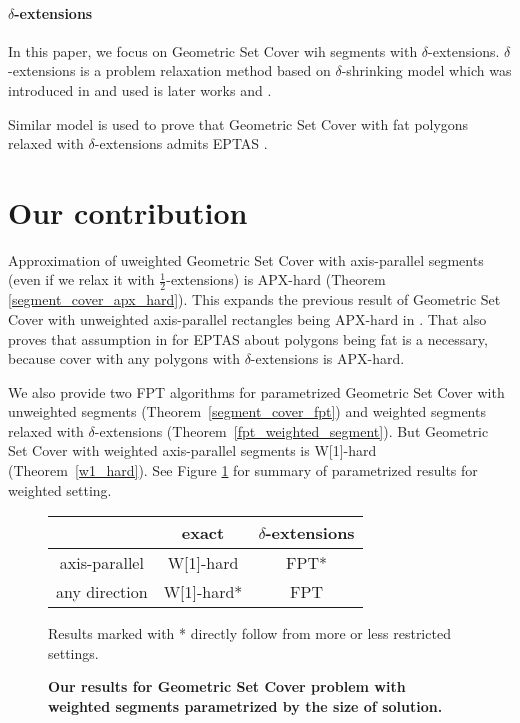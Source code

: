 \paragraph{$\delta$-extensions}
In this paper, we focus on Geometric Set Cover wih segments with $\delta$-extensions.
$\delta$-extensions is a problem relaxation method based on
$\delta$-shrinking model which was introduced in \cite{shrinking_original}
and used is later works \cite{shrinking1} and \cite{shrinking2}.

Similar model is used to prove that Geometric Set Cover with fat polygons
relaxed with $\delta$-extensions admits EPTAS \cite{harpeled12}.

\section*{Our contribution}
Approximation of uweighted Geometric Set Cover with axis-parallel segments
(even if we relax it with  $\frac{1}{2}$-extensions) is APX-hard
(Theorem \ref{segment_cover_apx_hard}).
This expands the previous result of Geometric Set Cover
with unweighted axis-parallel rectangles being APX-hard in \cite{rectangles_apx_hard}.
That also proves that assumption in \cite{harpeled12}
for EPTAS about polygons being fat is a necessary, because
cover with any polygons with $\delta$-extensions is APX-hard.

We also provide two FPT algorithms for parametrized Geometric Set Cover 	
with unweighted segments (Theorem~\ref{segment_cover_fpt})
and weighted segments relaxed with $\delta$-extensions
(Theorem~\ref{fpt_weighted_segment}).
But Geometric Set Cover with weighted
axis-parallel segments is W[1]-hard (Theorem~\ref{w1_hard}).
See Figure \ref{tab:weighted_fpt} for summary of parametrized
results for weighted setting.

\begin{figure}[h]
\begin{center}
\begin{tabular}{ | c | c | c | }
\hline
                & exact     & $\delta$-extensions \\ 
\hline                
 axis-parallel   & W[1]-hard & FPT* \\  
\hline                
 any direction   & W[1]-hard* & FPT \\
\hline                
\end{tabular}
\caption{\textbf{Our results for Geometric Set Cover problem with weighted segments 
parametrized by the size of solution.}}

Results marked with * directly follow from more or less restricted settings.
\label{tab:weighted_fpt}
\end{center}
\end{figure}


